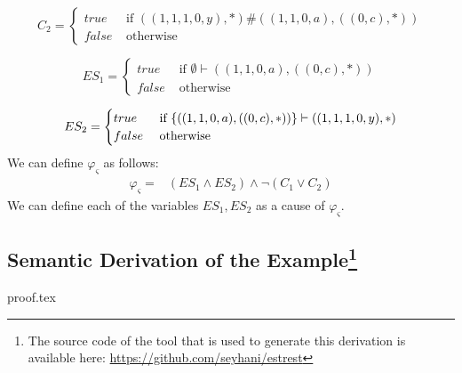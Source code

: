 \documentclass{article}
\begin{document}
$$
    C_2 = \begin{cases}
        true & \text{ if } ((1, 1, 1, 0, y), *)\# ((1, 1, 0, a), ((0, c), *)) \\
        false & \text{ otherwise }
    \end{cases}
$$

$$
    ES_1 = \begin{cases}
       true & \text{ if } \emptyset \vdash ((1, 1, 0, a), ((0, c), *)) \\
       false & \text{ otherwise }
    \end{cases}
$$

$$
    ES_2 = \begin{cases}
        true & \text{ if }  \{((1, 1, 0, a), ((0, c), *))\} \vdash ((1, 1, 1, 0, y), *) \\
        false & \text{ otherwise }
    \end{cases}
$$
We can define $\varphi_{\varsigma}$ as follows:
\begin{align*}
    \varphi_{\varsigma} = & (ES_1 \wedge ES_2) \wedge \neg (C_1 \vee C_2)
\end{align*}
We can define each of the variables $ES_1,ES_2$ as a cause of $\varphi_{\varsigma}$.

\pagebreak
\begin{appendices}
    \section{Semantic Derivation of the Example\protect\footnote[1]
        {The source code of the tool that is used to
         generate this derivation is available here: 
         \href{https://github.com/seyhani/estrest}
         {https://github.com/seyhani/estrest}
         }
    }
    {proof.tex}
\end{appendices}
\end{document}
